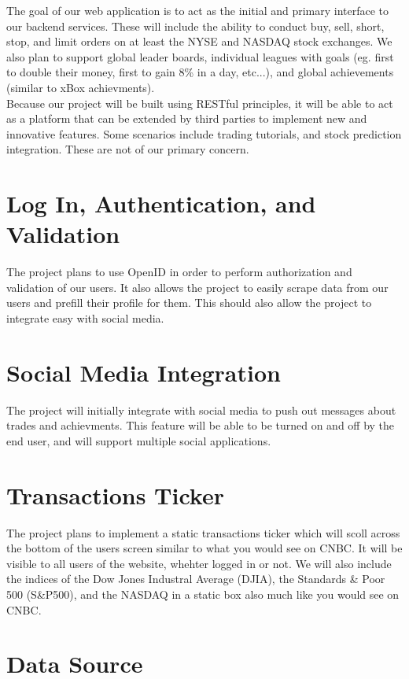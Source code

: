 \documentclass[11pt,letterpaper,oneside]{memoir}
\begin{document}
The goal of our web application is to act as the initial and primary interface to our backend
services. These will include the ability to conduct buy, sell, short, stop, and limit orders on
at least the NYSE and NASDAQ stock exchanges.  We also plan to support global leader boards,
individual leagues with goals (eg. first to double their money, first to gain 8\% in a day, etc...),
and global achievements (similar to xBox achievments).\\

Because our project will be built using RESTful principles, it will be able to act as a
platform that can be extended by third parties to implement new and innovative features.
Some scenarios include trading tutorials, and stock prediction integration.  These are not
of our primary concern.

\section{Log In, Authentication, and Validation}

The project plans to use OpenID in order to perform authorization and validation of our users.
It also allows the project to easily scrape data from our users and prefill their profile for them.
This should also allow the project to integrate easy with social media.

\section{Social Media Integration}

The project will initially integrate with social media to push out messages about trades and
achievments. This feature will be able to be turned on and off by the end user, and will support
multiple social applications.

\section{Transactions Ticker}

The project plans to implement a static transactions ticker which will scoll across the bottom
of the users screen similar to what you would see on CNBC.  It will be visible to all users
of the website, whehter logged in or not.  We will also include the indices of the Dow Jones
Industral Average (DJIA), the Standards \& Poor 500 (S\&P500), and the NASDAQ in a static box
also much like you would see on CNBC.

\section{Data Source}
\end{document}
